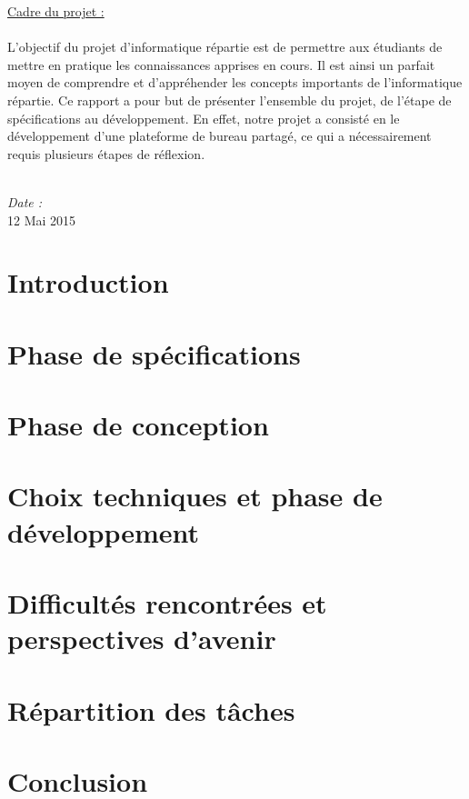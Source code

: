 \documentclass[a4paper,12pt]{report}
\begin{document}
\begin{titlepage}
    \large{\underline{Cadre du projet : }} \\ \\
    \normalsize{L'objectif du projet d'informatique répartie est de permettre aux étudiants de 
        mettre en pratique les connaissances apprises en cours. Il est ainsi un parfait moyen
        de comprendre et d'appréhender les concepts importants de l'informatique répartie. Ce rapport
        a pour but de présenter l'ensemble du projet, de l'étape de spécifications au développement. En effet, 
        notre projet a consisté en le développement d'une plateforme de bureau partagé, ce qui a 
        nécessairement requis plusieurs étapes de réflexion.} \\ \\
    \begin{center}
        \textit{Date :} \\ 12 Mai 2015
    \end{center}
\end{titlepage}

\tableofcontents

\chapter*{Introduction}


\chapter{Phase de spécifications}


\chapter{Phase de conception}


\chapter{Choix techniques et phase de développement}


\chapter{Difficultés rencontrées et perspectives d'avenir}


\chapter{Répartition des tâches}


\chapter*{Conclusion}

\end{document}

